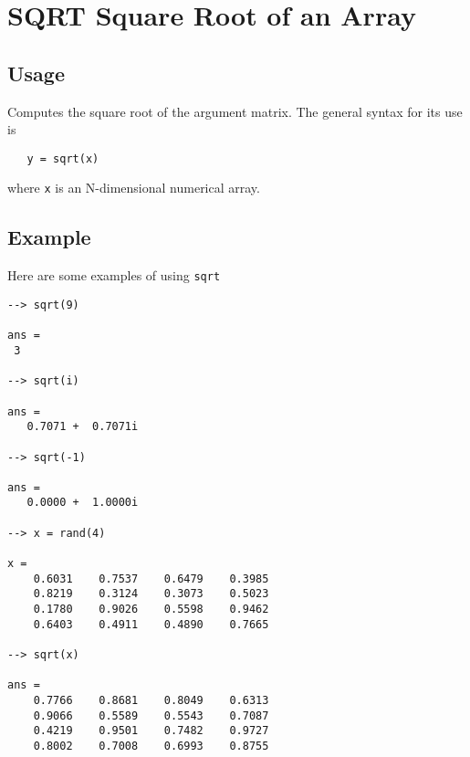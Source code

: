 \section{SQRT Square Root of an Array}

\subsection{Usage}

Computes the square root of the argument matrix.  The general
syntax for its use is
\begin{verbatim}
   y = sqrt(x)
\end{verbatim}
where \verb|x| is an N-dimensional numerical array.
\subsection{Example}

Here are some examples of using \verb|sqrt|
\begin{verbatim}
--> sqrt(9)

ans = 
 3 

--> sqrt(i)

ans = 
   0.7071 +  0.7071i 

--> sqrt(-1)

ans = 
   0.0000 +  1.0000i 

--> x = rand(4)

x = 
    0.6031    0.7537    0.6479    0.3985 
    0.8219    0.3124    0.3073    0.5023 
    0.1780    0.9026    0.5598    0.9462 
    0.6403    0.4911    0.4890    0.7665 

--> sqrt(x)

ans = 
    0.7766    0.8681    0.8049    0.6313 
    0.9066    0.5589    0.5543    0.7087 
    0.4219    0.9501    0.7482    0.9727 
    0.8002    0.7008    0.6993    0.8755 
\end{verbatim}
